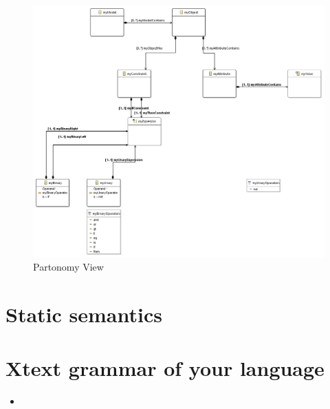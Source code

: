 \documentclass[paper=a4, fontsize=11pt]{scrartcl} %
\numberwithin{equation}{section} %
\numberwithin{figure}{section} %
\numberwithin{table}{section} %
\newcommand{\java}[2]{
\begin{itemize}
\item[]
\end{itemize}
}
\begin{document}
\begin{figure}[H]
\centering
\includegraphics[scale=0.7]{pictures/partView.png}
\caption{Partonomy View}
\end{figure}


\section{Static semantics}



\section{Xtext grammar of your language}
\java{../configproject/xtext/org.xtext.example.smdpdsl/src/org/xtext/example/mydsl/SmdpDsl.xtext}{Xtext Grammar}
\end{document}
